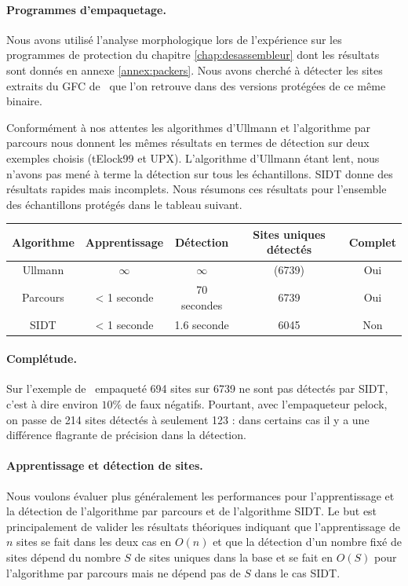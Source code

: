 \paragraph{Programmes d'empaquetage.}
Nous avons utilisé l'analyse morphologique lors de l'expérience sur les programmes de protection du chapitre \ref{chap:desassembleur} dont les résultats sont donnés en annexe \ref{annex:packers}.
Nous avons cherché à détecter les sites extraits du GFC de \hostname\ que l'on retrouve dans des versions protégées de ce même binaire.

Conformément à nos attentes les algorithmes d'Ullmann et l'algorithme par parcours nous donnent les mêmes résultats en termes de détection sur deux exemples choisis (tElock99 et UPX). L'algorithme d'Ullmann étant lent, nous n'avons pas mené à terme la détection sur tous les échantillons.
SIDT donne des résultats rapides mais incomplets. 
Nous résumons ces résultats pour l'ensemble des échantillons protégés dans le tableau suivant.

\begin{center}
\begin{tabular}{|c|c|c|c|c|}
\hline
 Algorithme & Apprentissage & Détection & Sites uniques détectés & Complet \\
 \hline
 Ullmann & $\infty$ & $\infty$ & (6739) & Oui\\
 Parcours & < 1 seconde & 70 secondes & 6739 & Oui\\
 SIDT & < 1 seconde & 1.6 seconde & 6045 & Non\\
 \hline
\end{tabular}
\end{center}

\paragraph{Complétude.}
Sur l'exemple de \hostname\ empaqueté 694 sites sur 6739 ne sont pas détectés par SIDT, c'est à dire environ $10\%$ de faux négatifs.
Pourtant, avec l'empaqueteur pelock, on passe de 214 sites détectés à seulement 123 : dans certains cas il y a une différence flagrante de précision dans la détection.


\paragraph{Apprentissage et détection de sites.}
Nous voulons évaluer plus généralement les performances pour l'apprentissage et la détection de l'algorithme par parcours et de l'algorithme SIDT.
Le but est principalement de valider les résultats théoriques indiquant que l'apprentissage de $n$ sites se fait dans les deux cas en $O(n)$ et que la détection d'un nombre fixé de sites dépend du nombre $S$ de sites uniques dans la base et se fait en $O(S)$ pour l'algorithme par parcours mais ne dépend pas de $S$ dans le cas SIDT.


